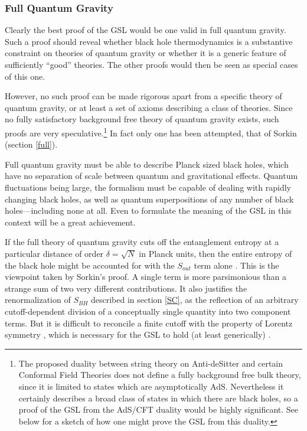 \documentclass[12pt]{article}
\begin{document}
\subsubsection{Full Quantum Gravity}\label{QG}

Clearly the best proof of the GSL would be one valid in full quantum gravity.  Such a proof should reveal whether black hole thermodynamics is a substantive constraint on theories of quantum gravity or whether it is a generic feature of sufficiently ``good'' theories.  The other proofs would then be seen as special cases of this one.

However, no such proof can be made rigorous apart from a specific theory of quantum gravity, or at least a set of axioms describing a class of theories.  Since no fully satisfactory background free theory of quantum gravity exists, such proofs are very speculative.\footnote{The proposed duality between string theory on Anti-deSitter and certain Conformal Field Theories \cite{AdS/CFT} does not define a fully background free bulk theory, since it is limited to states which are asymptotically AdS.  Nevertheless it certainly describes a broad class of states in which there are black holes, so a proof of the GSL from the AdS/CFT duality would be highly significant.  See below for a sketch of how one might prove the GSL from this duality.}  In fact only one has been attempted, that of Sorkin \cite{sorkin86} (section \ref{full}).

Full quantum gravity must be able to describe Planck sized black holes, which have no separation of scale between quantum and gravitational effects.  Quantum fluctuations being large, the formalism must be capable of dealing with rapidly changing black holes, as well as quantum superpositions of any number of black holes---including none at all.  Even to formulate the meaning of the GSL in this context will be a great achievement.

If the full theory of quantum gravity cuts off the entanglement entropy at a particular distance of order $\delta = \sqrt{N}$ in Planck units, then the entire entropy of the black hole might be accounted for with the $S_{out}$ term alone \cite{sorkin83}\cite{jacobson94}.  This is the viewpoint taken by Sorkin's proof.  A single term is more parsimonious than a strange sum of two very different contributions.  It also justifies the renormalization of $S_{BH}$ described in section \ref{SC}, as the reflection of an arbitrary cutoff-dependent division of a conceptually single quantity into two component terms.  But it is difficult to reconcile a finite cutoff with the property of Lorentz symmetry \cite{jacobson00}, which is necessary for the GSL to hold (at least generically) \cite{EFJW07}.
\end{document}
